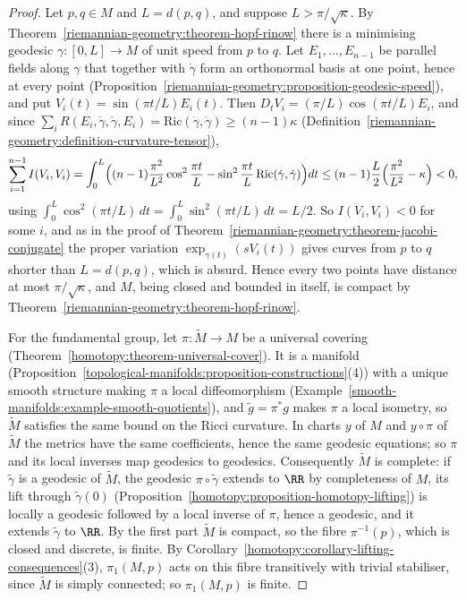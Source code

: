 \begin{proof}
Let $p, q \in M$ and $L = d(p, q)$, and suppose $L > \pi/\sqrt\kappa$. By Theorem~\ref{riemannian-geometry:theorem-hopf-rinow} there is a minimising geodesic
$\gamma \colon [0, L] \to M$ of unit speed from $p$ to $q$. Let $E_1, \ldots, E_{n-1}$ be parallel fields along $\gamma$ that together with $\dot\gamma$ form an orthonormal basis
at one point, hence at every point (Proposition~\ref{riemannian-geometry:proposition-geodesic-speed}), and put $V_i(t) = \sin(\pi t/L)E_i(t)$. Then $D_tV_i = (\pi/L)\cos(\pi t/L)E_i$,
and since $\sum_iR(E_i, \dot\gamma, \dot\gamma, E_i) = \mathrm{Ric}(\dot\gamma, \dot\gamma) \geq (n - 1)\kappa$ (Definition~\ref{riemannian-geometry:definition-curvature-tensor}),
\[
\sum_{i=1}^{n-1}I(V_i, V_i) = \int_0^L\Bigl((n - 1)\frac{\pi^2}{L^2}\cos^2\frac{\pi t}{L} - \sin^2\frac{\pi t}{L}\,\mathrm{Ric}(\dot\gamma, \dot\gamma)\Bigr)dt
\leq (n - 1)\frac L2\Bigl(\frac{\pi^2}{L^2} - \kappa\Bigr) < 0,
\]
using $\int_0^L\cos^2(\pi t/L)\,dt = \int_0^L\sin^2(\pi t/L)\,dt = L/2$. So $I(V_i, V_i) < 0$ for some $i$, and as in the proof of
Theorem~\ref{riemannian-geometry:theorem-jacobi-conjugate} the proper variation $\exp_{\gamma(t)}(sV_i(t))$ gives curves from $p$ to $q$ shorter than $L = d(p, q)$, which is
absurd. Hence every two points have distance at most $\pi/\sqrt\kappa$, and $M$, being closed and bounded in itself, is compact by
Theorem~\ref{riemannian-geometry:theorem-hopf-rinow}.

For the fundamental group, let $\pi \colon \widetilde{M} \to M$ be a universal covering (Theorem~\ref{homotopy:theorem-universal-cover}). It is a manifold
(Proposition~\ref{topological-manifolds:proposition-constructions}(4)) with a unique smooth structure making $\pi$ a local diffeomorphism
(Example~\ref{smooth-manifolds:example-smooth-quotients}), and $\tilde g = \pi^*g$ makes $\pi$ a local isometry, so $\widetilde{M}$ satisfies the same bound on the Ricci
curvature. In charts $y$ of $M$ and $y \circ \pi$ of $\widetilde{M}$ the metrics have the same coefficients, hence the same geodesic equations; so $\pi$ and its local inverses
map geodesics to geodesics. Consequently $\widetilde{M}$ is complete: if $\tilde\gamma$ is a geodesic of $\widetilde{M}$, the geodesic $\pi \circ \tilde\gamma$ extends to $\RR$
by completeness of $M$, its lift through $\tilde\gamma(0)$ (Proposition~\ref{homotopy:proposition-homotopy-lifting}) is locally a geodesic followed by a local inverse of $\pi$,
hence a geodesic, and it extends $\tilde\gamma$ to $\RR$. By the first part $\widetilde{M}$ is compact, so the fibre $\pi^{-1}(p)$, which is closed and discrete, is finite. By
Corollary~\ref{homotopy:corollary-lifting-consequences}(3), $\pi_1(M, p)$ acts on this fibre transitively with trivial stabiliser, since $\widetilde{M}$ is simply connected;
so $\pi_1(M, p)$ is finite.
\end{proof}

